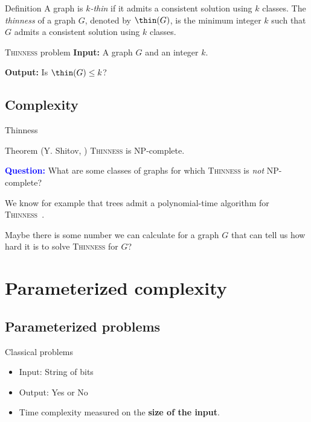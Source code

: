 \documentclass{beamer}
\begin{document}
\begin{frame}{Definition}
    A graph is \emph{$k$-thin} if it admits a consistent solution using $k$ classes.
    The \emph{thinness} of a graph $G$, denoted by $\thin(G)$, is the minimum integer $k$ such that $G$ admits a consistent solution using $k$ classes.
    \vspace{1em}
    \begin{block}{\textsc{Thinness} problem}
        \textbf{Input:} A graph $G$ and an integer $k$.

        \textbf{Output:} Is $\thin(G) \leq k$?
    \end{block}
\end{frame}


\subsection{Complexity}
\begin{frame}{Thinness}
    \begin{block}{Theorem (Y. Shitov, \cite{thinness-np-complete})}
        \textsc{Thinness} is NP-complete.
    \end{block}
    \pause
    \vspace{1em}
    \textbf{\textcolor{blue}{Question:}} What are some classes of graphs for which \textsc{Thinness} is \emph{not} NP-complete? 
    \pause 
    
    We know for example that trees admit a polynomial-time algorithm for \textsc{Thinness}~\cite{thinness-of-trees}.
    \pause

    Maybe there is some number we can calculate for a graph $G$ that can tell us how hard it is to solve \textsc{Thinness} for $G$?
\end{frame}

\section{Parameterized complexity}

\subsection{Parameterized problems}
\begin{frame}{Classical problems}
    \begin{itemize}
    \item Input: String of bits
    \item Output: Yes or No
    \item Time complexity measured on the \textbf{size of the input}.
    \end{itemize}
\end{frame}
\end{document}
